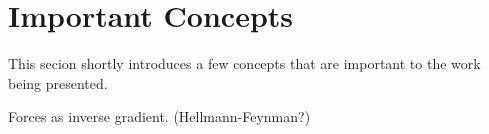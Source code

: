 \section{Important Concepts}
\label{sec:important-concepts}

This secion shortly introduces a few concepts that are important to the work being presented.

\bit
\item Forces as inverse gradient. (Hellmann-Feynman?)
\eit

\incomplete






